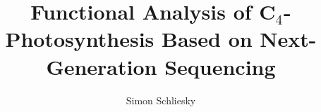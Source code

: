 \author{Simon Schliesky}
\date{}
\title{Functional Analysis of C$_4$-Photosynthesis Based on Next-Generation Sequencing}
